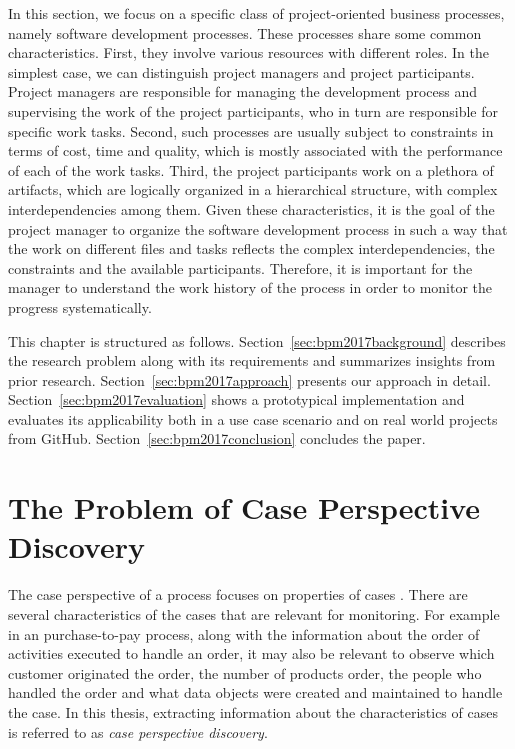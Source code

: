 	
	In this section, we focus on a specific class of project-oriented business processes,
	namely software development processes. These processes share some common
	characteristics. First, they involve various resources with different roles. In the 
	simplest case, we can distinguish project managers and project participants.
	Project managers are responsible for managing the development process and
	supervising the work of the project participants, who in turn are responsible for
	specific work tasks. Second, such processes are usually subject to constraints in
	terms of cost, time and quality, which is mostly associated with the performance
	of each of the work tasks. Third, the project participants work on a plethora of
	artifacts, which are logically organized in a hierarchical structure, with complex
	interdependencies among them. Given these characteristics, it is the goal of the project manager to organize the software development process in such a way
	that the work on different files and tasks reflects the complex interdependencies,
	the constraints and the available participants. Therefore, it is important for the
	manager to understand the work history of the process in order to monitor the
	progress systematically.


This chapter is structured as follows. Section~\ref{sec:bpm2017background} describes the research problem along with its requirements and summarizes insights from prior research. Section~\ref{sec:bpm2017approach} presents our approach in detail. Section~\ref{sec:bpm2017evaluation} shows a prototypical implementation and evaluates its applicability both in a use case scenario and on real world projects from GitHub. Section~\ref{sec:bpm2017conclusion} concludes the paper.

\section{The Problem of Case Perspective Discovery}



The case perspective of a process focuses on properties of cases \citep{DBLP:books/sp/Aalst16}. There are several characteristics of the cases that are relevant for monitoring. For example in an purchase-to-pay process, along with the information about the order of activities executed to handle an order, it may also be relevant to observe which customer originated the order, the number of products order, the people who handled the order and what data objects were created and maintained to handle the case. In this thesis, extracting information about the characteristics of cases is referred to as \emph{case perspective discovery}.

